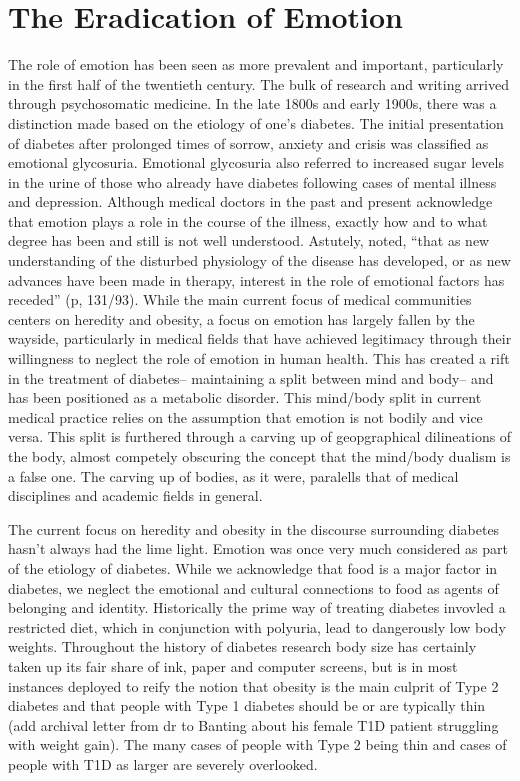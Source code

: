 \documentclass[12pt]{article}
\begin{document}
\section{The Eradication of Emotion} 
\doublespacing
The role of emotion has been seen as more prevalent and important, particularly in the first half of the twentieth century. The bulk of research and writing arrived through psychosomatic medicine. In the late 1800s and early 1900s, there was a distinction made based on the etiology of one's diabetes. The initial presentation of diabetes after prolonged times of sorrow, anxiety and crisis was classified as emotional glycosuria. Emotional glycosuria also referred to increased sugar levels in the urine of those who already have diabetes following cases of mental illness and depression. Although medical doctors in the past and present acknowledge that emotion plays a role in the course of the illness, exactly how and to what degree has been and still is not well understood. Astutely, \citet{burch_1962_role} noted, ``that as new understanding of the disturbed physiology of the disease has developed, or as new advances have been made in therapy, interest in the role of emotional factors has receded'' (p, 131/93). While the main current focus of medical communities centers on heredity and obesity, a focus on emotion has largely fallen by the wayside, particularly in medical fields that have achieved legitimacy through their willingness to neglect the role of emotion in human health. This has created a rift in the treatment of diabetes-- maintaining a split between mind and body-- and has been positioned as a metabolic disorder. This mind/body split in current medical practice relies on the assumption that emotion is not bodily and vice versa. 
This split is furthered through a carving up of geopgraphical dilineations of the body, almost competely obscuring the concept that the mind/body dualism is a false one. The carving up of bodies, as it were, paralells that of medical disciplines and academic fields in general. 

The current focus on heredity and obesity in the discourse surrounding diabetes hasn't always had the lime light. Emotion was once very much considered as part of the etiology of diabetes. While we acknowledge that food is a major factor in diabetes, we neglect the emotional and cultural connections to food as agents of belonging and identity. Historically the prime way of treating diabetes invovled a restricted diet, which in conjunction with polyuria, lead to dangerously low body weights. Throughout the history of diabetes research body size has certainly taken up its fair share of ink, paper and computer screens, but is in most instances deployed to reify the notion that obesity is the main culprit of Type 2 diabetes and that people with Type 1 diabetes should be or are typically thin (add archival letter from dr to Banting about his female T1D patient struggling with weight gain). The many cases of people with Type 2 being thin and cases of people with T1D as larger are severely overlooked. 
\end{document}
